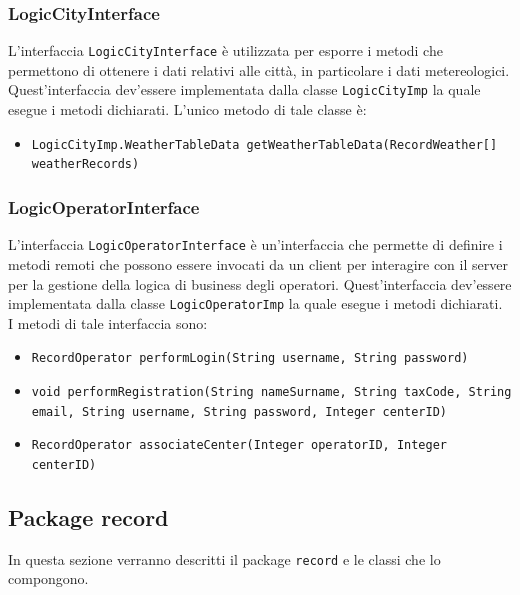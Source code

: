 \subsubsection{LogicCityInterface}
L'interfaccia \texttt{LogicCityInterface} è utilizzata per esporre i metodi che permettono di ottenere i dati relativi alle città, in particolare i dati metereologici.
Quest'interfaccia dev'essere implementata dalla classe \texttt{LogicCityImp} la quale esegue i metodi dichiarati.
L'unico metodo di tale classe è:
\begin{itemize}
    \item \texttt{LogicCityImp.WeatherTableData getWeatherTableData(RecordWeather[] weatherRecords)}
\end{itemize}

\subsubsection{LogicOperatorInterface}
L'interfaccia \texttt{LogicOperatorInterface} è un'interfaccia che permette di definire i metodi remoti che possono essere invocati da un client per interagire con il server per la gestione della logica di business degli operatori.
Quest'interfaccia dev'essere implementata dalla classe \texttt{LogicOperatorImp} la quale esegue i metodi dichiarati.
I metodi di tale interfaccia sono:
\begin{itemize}
    \item \texttt{RecordOperator performLogin(String username, String password)}
    \item \texttt{void performRegistration(String nameSurname, String taxCode, String email, String username, String password, Integer centerID)}
    \item \texttt{RecordOperator associateCenter(Integer operatorID, Integer centerID)}
\end{itemize}

\subsection{Package record}
In questa sezione verranno descritti il package \texttt{record} e le classi che lo compongono.\\

